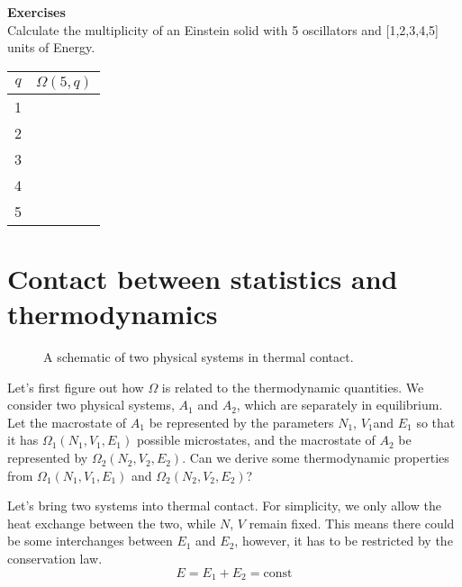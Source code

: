 {\bf Exercises}\\
Calculate the multiplicity of an Einstein solid with 5 oscillators and [1,2,3,4,5] units of Energy.\\
\begin{tabular}{c|c }
$q$ &$\Omega(5,q)$ \\\hline
 1     &  \\
 2     &  \\
 3     &  \\
 4     &  \\
 5     &  \\\hline
\end{tabular}



\section{Contact between statistics and thermodynamics}

\begin{figure}[h]
\centering
{}
\caption{A schematic of two physical systems in thermal contact.}
\end{figure}

Let's first figure out how $\Omega$ is related to the thermodynamic quantities. We consider two physical systems, $A_1$ and $A_2$, which are separately in equilibrium. Let the macrostate of $A_1$ be represented by the parameters $N_1$, $V_1$and $E_1$ so that it has $\Omega_1(N_1, V_1, E_1)$ possible microstates, and the macrostate of $A_2$ be represented by $\Omega_2(N_2,V_2, E_2)$. Can we derive some thermodynamic properties from $\Omega_1(N_1, V_1, E_1)$ and $\Omega_2(N_2, V_2, E_2)$?

Let's bring two systems into thermal contact. For simplicity, we only allow the heat exchange between the two, while $N$, $V$ remain fixed. This means there could be some interchanges between $E_1$ and $E_2$, however, it has to be restricted by the conservation law.
\begin{equation} E = E_1 + E_2 = \textrm{const} \end{equation}

